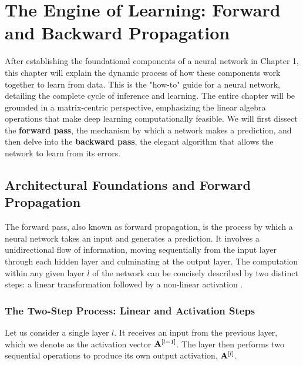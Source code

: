 \ifdefined\ispartofbook
\else
  
  
\fi

\chapter{The Engine of Learning: Forward and Backward Propagation}
\label{chap:propagation}


After establishing the foundational components of a neural network in Chapter 1, this chapter will explain the dynamic process of how these components work together to learn from data. This is the "how-to" guide for a neural network, detailing the complete cycle of inference and learning. The entire chapter will be grounded in a matrix-centric perspective, emphasizing the linear algebra operations that make deep learning computationally feasible. We will first dissect the \textbf{forward pass}, the mechanism by which a network makes a prediction, and then delve into the \textbf{backward pass}, the elegant algorithm that allows the network to learn from its errors.

\section{Architectural Foundations and Forward Propagation}
\label{sec:forward_prop}

The forward pass, also known as forward propagation, is the process by which a neural network takes an input and generates a prediction. It involves a unidirectional flow of information, moving sequentially from the input layer through each hidden layer and culminating at the output layer. The computation within any given layer $l$ of the network can be concisely described by two distinct steps: a linear transformation followed by a non-linear activation \cite{Nielsen2015Book, Goodfellow2016Book}.

\subsection{The Two-Step Process: Linear and Activation Steps}
Let us consider a single layer $l$. It receives an input from the previous layer, which we denote as the activation vector $\mathbf{A}^{[l-1]}$. The layer then performs two sequential operations to produce its own output activation, $\mathbf{A}^{[l]}$.

